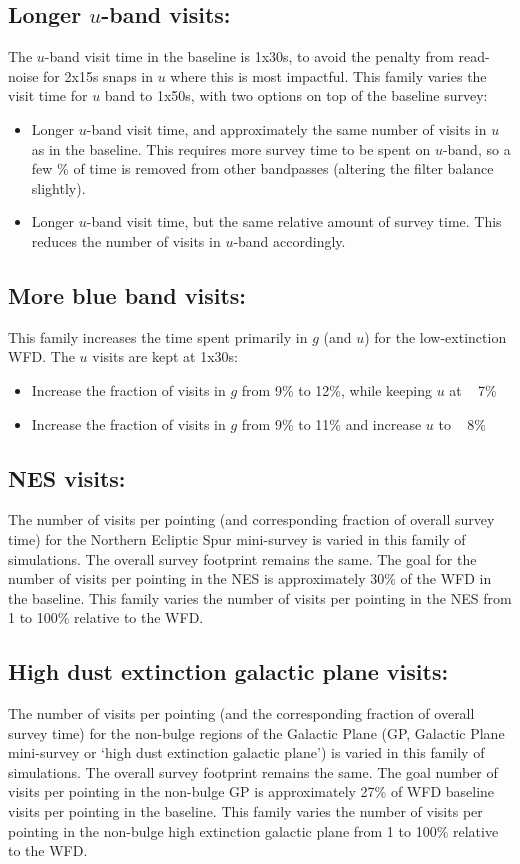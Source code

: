 \subsection{Longer $u$-band visits:}
The $u$-band visit time in the baseline is 1x30s, to avoid the penalty from read-noise for 2x15s snaps in $u$ where this is most impactful. This family varies the visit time for $u$ band to 1x50s, with two options on top of the baseline survey: 
\begin{itemize}
\item Longer $u$-band visit time, and approximately the same number of visits in $u$ as in the baseline. This requires more survey time to be spent on $u$-band, so a few \% of time is removed from other bandpasses (altering the filter balance slightly). 
\item Longer $u$-band visit time, but the same relative amount of survey time. This reduces the number of visits in $u$-band accordingly.
\end{itemize} 

\subsection{More blue band visits:}
This family increases the time spent primarily in $g$ (and $u$) for the low-extinction WFD. The $u$ visits are kept at 1x30s: 
\begin{itemize}
\item Increase the fraction of visits in $g$ from 9\% to 12\%, while keeping $u$ at ~ 7\%
\item Increase the fraction of visits in $g$ from 9\% to 11\% and increase $u$ to ~ 8\%
\end{itemize}

\subsection{NES visits:}
The number of visits per pointing (and corresponding fraction of overall survey time) for the Northern Ecliptic Spur mini-survey is varied in this family of simulations. The overall survey footprint remains the same. The goal for the number of visits per pointing in the NES is approximately 30\% of the WFD in the baseline. This family varies the number of visits per pointing in the NES from 1 to 100\% relative to the WFD. 

\subsection{High dust extinction galactic plane visits: }
The number of visits per pointing (and the corresponding fraction of overall survey time) for the non-bulge regions of the Galactic Plane (GP, Galactic Plane mini-survey or `high dust extinction galactic plane') is varied in this family of simulations. The overall survey footprint remains the same. The goal number of visits per pointing in the non-bulge GP is approximately 27\% of WFD baseline visits per pointing in the baseline.  This family varies the number of visits per pointing in the non-bulge high extinction galactic plane from 1 to 100\% relative to the WFD.


